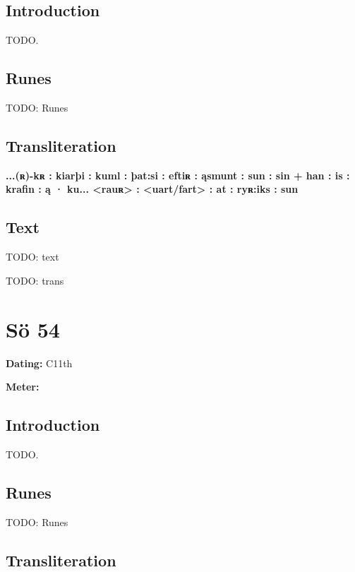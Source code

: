 \subsection{Introduction}

TODO.

\subsection{Runes}

TODO: Runes%

\subsection{Transliteration}

\textbf{...(ʀ)-kʀ : kiarþi : kuml : þat:si : eftiʀ : ąsmunt : sun : sin + han : is : krafin : ą · ku... <rauʀ> : <uart/fart> : at : ryʀ:iks : sun}

\subsection{Text}

\bpg\bpa[0]%
TODO: text\epa

\bpb TODO: trans\epb\epg

\sectionline\clearpage


\section{Sö 54}

\begin{flushright}%
\textbf{Dating:} C11th

\textbf{Meter:} \Fornyrdislag
\end{flushright}%

\subsection{Introduction}

TODO.

\subsection{Runes}

TODO: Runes%

\subsection{Transliteration}

